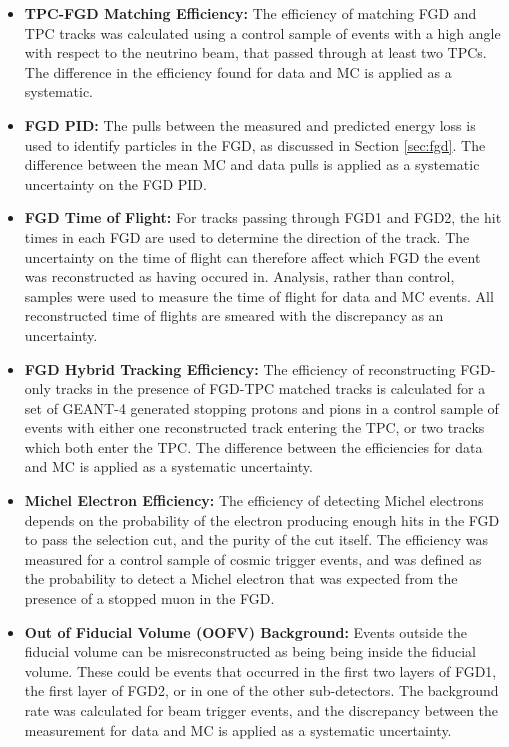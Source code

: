 \begin{itemize}
\item \textbf{TPC-FGD Matching Efficiency:} The efficiency of matching FGD and TPC tracks was calculated using a control sample of events with a high angle with respect to the neutrino beam, that passed through at least two TPCs. The difference in the efficiency found for data and MC is applied as a systematic.

\item \textbf{FGD PID:} The pulls between the measured and predicted energy loss is used to identify particles in the FGD, as discussed in Section \ref{sec:fgd}. The difference between the mean MC and data pulls is applied as a systematic uncertainty on the FGD PID.

\item \textbf{FGD Time of Flight:} For tracks passing through FGD1 and FGD2, the hit times in each FGD are used to determine the direction of the track. The uncertainty on the time of flight can therefore affect which FGD the event was reconstructed as having occured in. Analysis, rather than control, samples were used to measure the time of flight for data and MC events. All reconstructed time of flights are smeared with the discrepancy as an uncertainty.

\item \textbf{FGD Hybrid Tracking Efficiency:} The efficiency of reconstructing FGD-only tracks in the presence of FGD-TPC matched tracks is calculated for a set of GEANT-4 generated stopping protons and pions in a control sample of events with either one reconstructed track entering the TPC, or two tracks which both enter the TPC. The difference between the efficiencies for data and MC is applied as a systematic uncertainty.

\item \textbf{Michel Electron Efficiency:} The efficiency of detecting Michel electrons depends on the probability of the electron producing enough hits in the FGD to pass the selection cut, and the purity of the cut itself. The efficiency was measured for a control sample of cosmic trigger events, and was defined as the probability to detect a Michel electron that was expected from the presence of a stopped muon in the FGD.

\item \textbf{Out of Fiducial Volume (OOFV) Background:} Events outside the fiducial volume can be misreconstructed as being being inside the fiducial volume. These could be events that occurred in the first two layers of FGD1, the first layer of FGD2, or in one of the other sub-detectors. The background rate was calculated for beam trigger events, and the discrepancy between the measurement for data and MC is applied as a systematic uncertainty.


\end{itemize}

